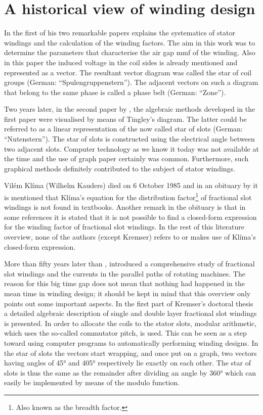 \chapter{A historical view of winding design}
In the first of his two remarkable papers \cite{REF-00835, REF-00836} explains the systematics of stator windings and the calculation of the winding factors. The aim in this work was to determine the parameters that characterise the air gap mmf of the winding. Also in this paper the induced voltage in the coil sides is already mentioned and represented as a vector. The resultant vector diagram was called the star of coil groups (German: ``Spulengruppenstern''). The adjacent vectors on such a diagram that belong to the same phase is called a phase belt (German: ``Zone'').

Two years later, in the second paper by \cite{REF-00837}, the algebraic methods developed in the first paper were visualised by means of Tingley's diagram. The latter could be referred to as a linear representation of the now called star of slots (German: ``Nutenstern''). The star of slots is constructed using the electrical angle between two adjacent slots. Computer technology as we know it today was not available at the time and the use of graph paper certainly was common. Furthermore, such graphical methods definitely contributed to the subject of stator windings.

Vil\'em Kl\'ima (Wilhelm Kauders) died on 6 October 1985 and in an obituary by \cite{REF-01054} it is mentioned that Kl\'ima's equation for the distribution factor\footnote{Also known as the breadth factor.} of fractional slot windings is not found in textbooks. Another remark in the obituary is that in some references it is stated that it is not possible to find a closed-form expression for the winding factor of fractional slot windings. In the rest of this literature overview, none of the authors (except Kremser) refers to or makes use of Kl\'ima's closed-form expression. 

More than fifty years later than \cite{REF-00837}, \cite{REF-00266} introduced a comprehensive study of fractional slot windings and the currents in the parallel paths of rotating machines. The reason for this big time gap does not mean that nothing had happened in the mean  time in winding design; it should be kept in mind that this overview only points out some important aspects. In the first part of Kremser's doctoral thesis a detailed algebraic description of single and double layer fractional slot windings is presented. In order to allocate the coils to the stator slots, modular arithmetic, which uses the so-called commutator pitch, is used. This can be seen as a step toward using computer programs to automatically performing winding designs. In the star of slots the vectors start wrapping, and once put on a graph, two vectors having angles of \ang{45} and \ang{405} respectively lie exactly on each other. The star of slots is thus the same as the remainder after dividing an angle by \ang{360} which can easily be implemented by means of the modulo function.  

